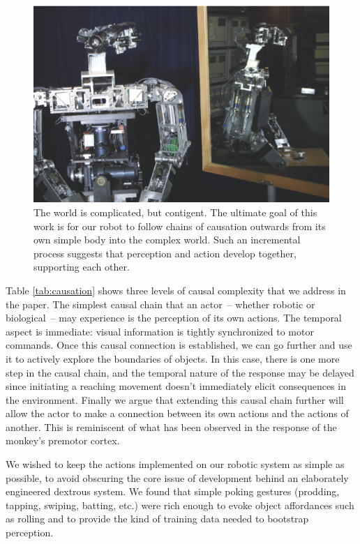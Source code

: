 \ifverbose
\begin{figure}[tbh]
\begin{center}
\includegraphics[width=12cm]{mirror-cog.eps}
\caption{ 
\label{fig:mirror-cog}
%
The world is complicated, but contigent.
The ultimate goal of this work is for our robot to follow chains of
causation outwards from its own simple body into the complex world.
Such an incremental process suggests that perception and action
develop together, supporting each other.
%
}
\end{center}
\end{figure}
\fi


Table \ref{tab:causation} shows three levels of causal complexity
that we address in the paper.
The simplest causal chain that an actor~-- whether robotic or biological~-- may experience is the
perception of its own actions.  The temporal aspect is immediate:
visual information is tightly synchronized to motor commands.
Once this causal connection is established, we can go further and use
it to actively explore the boundaries of objects.  In this case, there
is one more step in the causal chain, and the temporal nature of
the response may be delayed since initiating a reaching movement doesn't
immediately elicit consequences in the environment.  
Finally we argue that extending this causal chain further will allow
the actor to make a connection between its own actions and the actions 
of another. This is reminiscent of what has been observed in the response
of the monkey's premotor cortex. 

%
%
%
We wished to keep the actions implemented on our robotic system as
simple as possible, to avoid obscuring the core issue of development
behind an elaborately engineered dextrous system.
%
%
%
%
We found that simple poking gestures
(prodding, tapping, swiping, batting, etc.) were rich enough 
to evoke object affordances such as rolling and to provide
the kind of training data needed to bootstrap perception.


